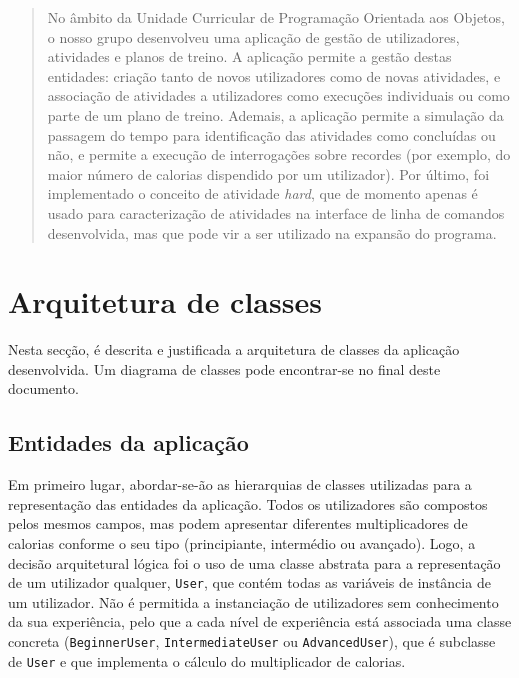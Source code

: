 \documentclass[12pt, a4paper]{article}
\begin{document}
\begin{abstract}
    No âmbito da Unidade Curricular de Programação Orientada aos Objetos, o nosso grupo desenvolveu
    uma aplicação de gestão de utilizadores, atividades e planos de treino. A aplicação permite a
    gestão destas entidades: criação tanto de novos utilizadores como de novas atividades, e
    associação de atividades a utilizadores como execuções individuais ou como parte de um plano de
    treino. Ademais, a aplicação permite a simulação da passagem do tempo para identificação das
    atividades como concluídas ou não, e permite a execução de interrogações sobre recordes (por
    exemplo, do maior número de calorias dispendido por um utilizador). Por último, foi implementado
    o conceito de atividade \emph{hard}, que de momento apenas é usado para caracterização de
    atividades na interface de linha de comandos desenvolvida, mas que pode vir a ser utilizado na
    expansão do programa.
\end{abstract}

\section{Arquitetura de classes}

Nesta secção, é descrita e justificada a arquitetura de classes da aplicação desenvolvida. Um
diagrama de classes pode encontrar-se no final deste documento.

\subsection{Entidades da aplicação}

Em primeiro lugar, abordar-se-ão as hierarquias de classes utilizadas para a representação das
entidades da aplicação. Todos os utilizadores são compostos pelos mesmos campos, mas podem
apresentar diferentes multiplicadores de calorias conforme o seu tipo (principiante, intermédio ou
avançado). Logo, a decisão arquitetural lógica foi o uso de uma classe abstrata para a representação
de um utilizador qualquer, \texttt{User}, que contém todas as variáveis de instância de um
utilizador. Não é permitida a instanciação de utilizadores sem conhecimento da sua experiência, pelo
que a cada nível de experiência está associada uma classe concreta (\texttt{BeginnerUser},
\texttt{IntermediateUser} ou \texttt{AdvancedUser}), que é subclasse de \texttt{User} e que
implementa o cálculo do multiplicador de calorias.
\end{document}
